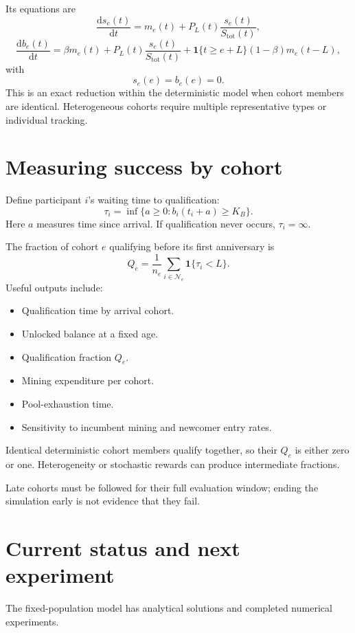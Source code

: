 \documentclass[11pt,a4paper]{article}
\newcommand{\ind}{\mathbf{1}}
\newcommand{\rmd}{\mathrm{d}}
\begin{document}
Its equations are
\begin{equation}
\boxed{\frac{\rmd s_e(t)}{\rmd t}=m_e(t)+P_L(t)\frac{s_e(t)}{S_{\mathrm{tot}}(t)},}
\end{equation}
\begin{equation}
\boxed{\frac{\rmd b_e(t)}{\rmd t}=\beta m_e(t)+P_L(t)\frac{s_e(t)}{S_{\mathrm{tot}}(t)}+\ind\{t\ge e+L\}(1-\beta)m_e(t-L),}
\end{equation}
with
\begin{equation}
s_e(e)=b_e(e)=0.
\end{equation}
This is an exact reduction within the deterministic model when cohort members are identical. Heterogeneous cohorts require multiple representative types or individual tracking.

\section{Measuring success by cohort}
Define participant $i$'s waiting time to qualification:
\begin{equation}
\boxed{\tau_i=\inf\{a\ge0:b_i(t_i+a)\ge K_B\}.}
\end{equation}
Here $a$ measures time since arrival. If qualification never occurs, $\tau_i=\infty$.

The fraction of cohort $e$ qualifying before its first anniversary is
\begin{equation}
\boxed{Q_e=\frac1{n_e}\sum_{i\in\mathcal N_e}\ind\{\tau_i<L\}.}
\end{equation}
Useful outputs include:
\begin{itemize}
\item Qualification time by arrival cohort.
\item Unlocked balance at a fixed age.
\item Qualification fraction $Q_e$.
\item Mining expenditure per cohort.
\item Pool-exhaustion time.
\item Sensitivity to incumbent mining and newcomer entry rates.
\end{itemize}
Identical deterministic cohort members qualify together, so their $Q_e$ is either zero or one. Heterogeneity or stochastic rewards can produce intermediate fractions.

Late cohorts must be followed for their full evaluation window; ending the simulation early is not evidence that they fail.

\section{Current status and next experiment}
The fixed-population model has analytical solutions and completed numerical experiments.
\end{document}
